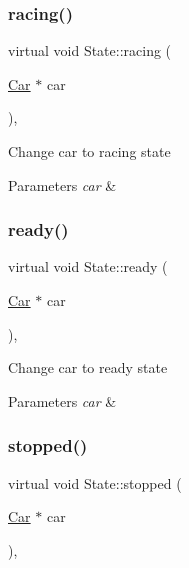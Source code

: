 \subsubsection{\texorpdfstring{racing()}{racing()}}
{\footnotesize\ttfamily virtual void State\+::racing (\begin{DoxyParamCaption}\item[{\mbox{\hyperlink{class_car}{Car}} $\ast$}]{car }\end{DoxyParamCaption})\hspace{0.3cm}{\ttfamily [inline]}, {\ttfamily [virtual]}}

Change car to racing state 
\begin{DoxyParams}{Parameters}
{\em car} & \\
\hline
\end{DoxyParams}
\mbox{\label{class_state_a3dbe765648d6f194e48f9371b0bddbed}} 
\subsubsection{\texorpdfstring{ready()}{ready()}}
{\footnotesize\ttfamily virtual void State\+::ready (\begin{DoxyParamCaption}\item[{\mbox{\hyperlink{class_car}{Car}} $\ast$}]{car }\end{DoxyParamCaption})\hspace{0.3cm}{\ttfamily [inline]}, {\ttfamily [virtual]}}

Change car to ready state 
\begin{DoxyParams}{Parameters}
{\em car} & \\
\hline
\end{DoxyParams}
\mbox{\label{class_state_ae09018d67a94ff52d48fbbf62e5e0a76}} 
\subsubsection{\texorpdfstring{stopped()}{stopped()}}
{\footnotesize\ttfamily virtual void State\+::stopped (\begin{DoxyParamCaption}\item[{\mbox{\hyperlink{class_car}{Car}} $\ast$}]{car }\end{DoxyParamCaption})\hspace{0.3cm}{\ttfamily [inline]}, {\ttfamily [virtual]}}

